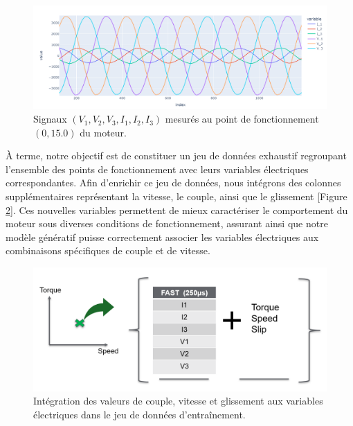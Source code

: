 \begin{figure}[hbt!]
  \centering
  \includegraphics[width=14cm]{images_pfe/V_I_data.png}
  \caption{Signaux \((V_1, V_2, V_3, I_1, I_2, I_3)\) mesurés au point de fonctionnement \((0, 15.0)\) du moteur.}
  \label{fig:data_v_i}
\end{figure}
\FloatBarrier

À terme, notre objectif est de constituer un jeu de données exhaustif regroupant l'ensemble des points
de fonctionnement avec leurs variables électriques correspondantes. Afin d'enrichir ce jeu de données,
nous intégrons des colonnes supplémentaires représentant la vitesse, le couple, ainsi que le glissement [Figure \ref{fig:data_vcg}].
Ces nouvelles variables permettent de mieux caractériser le comportement du moteur sous diverses conditions
de fonctionnement, assurant ainsi que notre modèle génératif puisse correctement associer les variables
électriques aux combinaisons spécifiques de couple et de vitesse.

\begin{figure}[hbt!]
  \centering
  \includegraphics[width=13cm]{images_pfe/couple_vittese_glissement.png}
  \caption{Intégration des valeurs de couple, vitesse et glissement aux variables électriques dans le jeu de données d'entraînement.}
  \label{fig:data_vcg}
\end{figure}
\FloatBarrier


